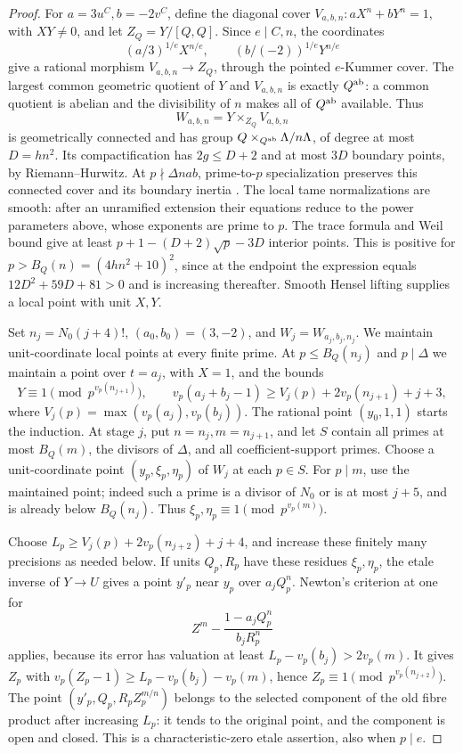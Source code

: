\begin{proof}
For \(a=3u^C,b=-2v^C\), define the diagonal cover
\(V_{a,b,n}:aX^n+bY^n=1\), with \(XY\ne0\), and let
\(Z_Q=Y/[Q,Q]\). Since \(e\mid C,n\), the coordinates
\[
 (a/3)^{1/e}X^{n/e},\qquad (b/(-2))^{1/e}Y^{n/e}
\]
give a rational morphism \(V_{a,b,n}\to Z_Q\), through the pointed
\(e\)-Kummer cover. The largest common geometric quotient of \(Y\)
and \(V_{a,b,n}\) is exactly \(Q^{\rm ab}\): a common quotient is
abelian and the divisibility of \(n\) makes all of \(Q^{\rm ab}\)
available. Thus
\[
 W_{a,b,n}=Y\times_{Z_Q}V_{a,b,n}
\]
is geometrically connected and has group
\(Q\times_{Q^{\rm ab}}\Lambda/n\Lambda\), of degree at most
\(D=hn^2\). Its compactification has \(2g\le D+2\) and at most
\(3D\) boundary points, by Riemann--Hurwitz.
At \(p\nmid\Delta nab\), prime-to-\(p\) specialization preserves
this connected cover and its boundary inertia
\citep[Expose XIII, Corollary 2.9, section 2.10, Lemma 2.11,
pp.~288--290]{RootSGA1}. The local tame normalizations are smooth:
after an unramified extension their equations reduce to the power
parameters above, whose exponents are prime to \(p\).
The trace formula and Weil bound
\citep[(1.5.1) and Theorem (1.6), pp.~275--276]{RootDeligne1974}
give at least \(p+1-(D+2)\sqrt p-3D\) interior points.
This is positive for \(p>B_Q(n)=(4hn^2+10)^2\), since at the endpoint
the expression equals \(12D^2+59D+81>0\) and is increasing thereafter.
Smooth Hensel lifting supplies a local point with unit \(X,Y\).

Set \(n_j=N_0(j+4)!\), \((a_0,b_0)=(3,-2)\), and
\(W_j=W_{a_j,b_j,n_j}\). We maintain unit-coordinate local points
at every finite prime. At \(p\le B_Q(n_j)\) and \(p\mid\Delta\)
we maintain a point over \(t=a_j\), with \(X=1\), and the bounds
\[
 Y\equiv1\pmod{p^{v_p(n_{j+1})}},\qquad
 v_p(a_j+b_j-1)\ge V_j(p)+2v_p(n_{j+1})+j+3,
\]
where \(V_j(p)=\max(v_p(a_j),v_p(b_j))\).
The rational point \((y_0,1,1)\) starts the induction.
At stage \(j\), put \(n=n_j,m=n_{j+1}\), and let \(S\) contain
all primes at most \(B_Q(m)\), the divisors of \(\Delta\), and all
coefficient-support primes. Choose a unit-coordinate point
\((y_p,\xi_p,\eta_p)\) of \(W_j\) at each \(p\in S\).
For \(p\mid m\), use the maintained point; indeed such a prime is
a divisor of \(N_0\) or is at most \(j+5\), and is already below
\(B_Q(n_j)\). Thus \(\xi_p,\eta_p\equiv1\pmod{p^{v_p(m)}}\).

Choose
\(L_p\ge V_j(p)+2v_p(n_{j+2})+j+4\), and increase these finitely
many precisions as needed below. If units \(Q_p,R_p\) have these
residues \(\xi_p,\eta_p\), the etale inverse of \(Y\to U\)
gives a point \(y'_p\) near \(y_p\) over \(a_jQ_p^n\).
Newton's criterion at one for
\[
 Z^m-\frac{1-a_jQ_p^n}{b_jR_p^n}
\]
applies, because its error has valuation at least \(L_p-v_p(b_j)>2v_p(m)\).
It gives \(Z_p\) with
\(v_p(Z_p-1)\ge L_p-v_p(b_j)-v_p(m)\), hence
\(Z_p\equiv1\pmod{p^{v_p(n_{j+2})}}\).
The point \((y'_p,Q_p,R_pZ_p^{m/n})\) belongs to the selected component
of the old fibre product after increasing \(L_p\): it tends to the
original point, and the component is open and closed. This is a
characteristic-zero etale assertion, also when \(p\mid e\).


\end{proof}
